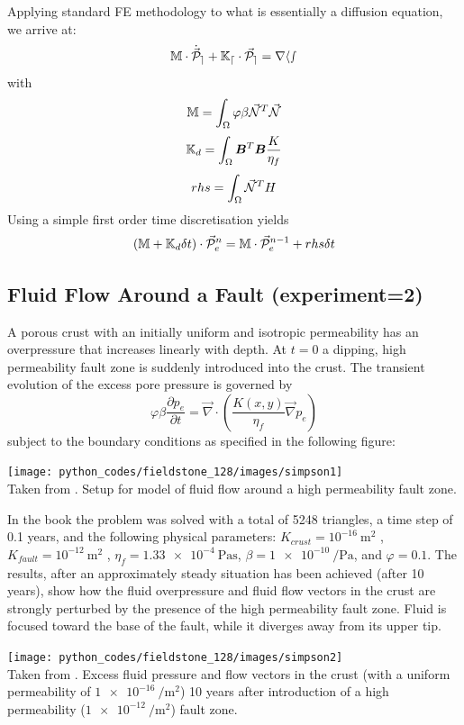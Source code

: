 Applying standard FE methodology to what is essentially a diffusion equation, we arrive at:
\[
{{\mathbb{M}}} \cdot \dot{\vec{\cal P}}_e + {{\mathbb{K}}}_d \cdot \vec{\cal P}_e = rhs
\]
with
\[
{{\mathbb{M}}} = \int_\Omega \varphi \beta \vec{{\mathcal{N}}}^T \vec{{\mathcal{N}}} 
\]
\[
{\mathbb{K}}_d = \int_\Omega {\bm B}^T {\bm B} \frac{K}{\eta_f} 
\]
\[
rhs = \int_\Omega \vec{{\mathcal{N}}}^T  H 
\]
Using a simple first order time discretisation yields
\[
({{\mathbb{M}}} + {{\mathbb{K}}}_d \delta t) \cdot \vec{\cal P}_e^n = {\mathbb{M}} \cdot \vec{\cal P}_e^{n-1} + rhs \delta t
\]



\subsection*{Fluid Flow Around a Fault (experiment=2)}

A porous crust with an initially uniform and isotropic permeability has an
overpressure that increases linearly with depth. At $t=0$ a dipping, high permeability fault zone is
suddenly introduced into the crust.
The transient evolution of the excess pore pressure is governed by
\begin{equation}
\varphi \beta  \frac{\partial p_e}{\partial t}
=
\vec\nabla \cdot \left( \frac{K(x,y)}{\eta_f} \vec\nabla p_e  \right) 
\end{equation}
subject to the boundary conditions as specified in the following figure:
\begin{center}
\texttt{[image: python\_codes/fieldstone\_128/images/simpson1]}\\
{\captionfont Taken from \cite{simp17}. Setup for model of fluid flow around a high permeability fault zone.}
\end{center}

In the book the problem was solved with a total of 5248 triangles, 
a time step of 0.1 years, and the following physical parameters:
$K_{crust}=10^{-16}~\si{\square\meter}$ , 
$K_{fault}=10^{-12}~\si{\square\meter}$ , 
$\eta_f  = \SI{1.33e-4}{\pascal\second}$, 
$\beta=\SI{1e-10}{\per\pascal}$, and $\varphi=0.1$. 
The results, after an approximately steady situation has been achieved (after 10 years), show how the fluid overpressure
and fluid flow vectors in the crust are strongly perturbed by the presence of the high permeability
fault zone. Fluid is focused toward the base of the fault, while it diverges away from its upper tip.
\begin{center}
\texttt{[image: python\_codes/fieldstone\_128/images/simpson2]}\\
{\captionfont Taken from \cite{simp17}. Excess fluid pressure and flow vectors in the crust 
(with a uniform permeability of $\SI{1e-16}{\per\square\meter}$) 10 years after
introduction of a high permeability ($\SI{1e-12}{\per\square\meter}$) fault zone.}
\end{center}

